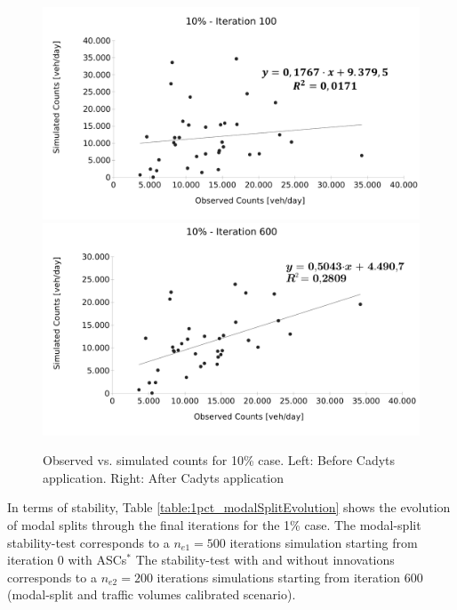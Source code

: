 \documentclass[Journal,letterpaper]{ascelike-new}
\begin{document}
\begin{figure}[h!]
	\centering
	\includegraphics[scale=0.22]{images/10pct_it100.pdf}\hspace{1cm}
	\includegraphics[scale=0.22]{images/10pct_it600.pdf}
	\caption{Observed vs. simulated counts for 10\% case. Left: Before Cadyts application. Right: After Cadyts application}
	\label{fig:obs_vs_sim_10pct}
\end{figure}
In terms of stability, Table \ref{table:1pct_modalSplitEvolution} shows the evolution of modal splits through the final iterations for the 1\% case. The modal-split stability-test corresponds to a $n_{e1}=500$ iterations simulation starting from iteration 0 with ASCs$^{*}$ The stability-test with and without innovations corresponds to a $n_{e2}=200$ iterations simulations starting from iteration 600 (modal-split and traffic volumes calibrated scenario).
\end{document}
